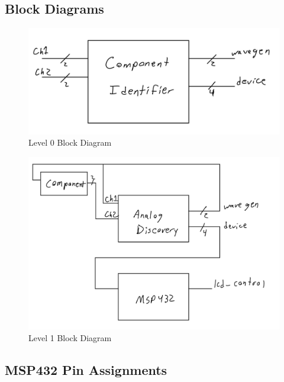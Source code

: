 \documentclass[12pt]{article}
\begin{document}
\subsection{Block Diagrams}

\begin{figure}[H]
\begin{center}
	\includegraphics[width=\textwidth]{./img/level0.png}
	\caption{\label{fig:lvl0}Level 0 Block Diagram}
\end{center}
\end{figure}

\begin{figure}[H]
\begin{center}
	\includegraphics[width=\textwidth]{./img/level1.png}
	\caption{\label{fig:lvl1}Level 1 Block Diagram}
\end{center}
\end{figure}

\subsection{MSP432 Pin Assignments}
\end{document}
